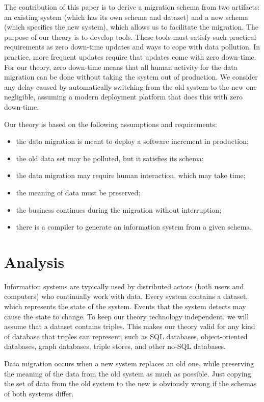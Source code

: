 \documentclass{elsarticle}
\begin{document}
   The contribution of this paper is to derive a migration schema from two artifacts: an existing system
   (which has its own schema and dataset) and a new schema (which specifies the new system),
   which allows us to facilitate the migration.
   The purpose of our theory is to develop tools.
   These tools must satisfy such practical requirements as
   zero down-time updates and ways to cope with data pollution.
   In practice, more frequent updates require that updates come with zero down-time.
   For our theory, zero down-time means that all human activity for the data migration can be done without taking the system out of production.
   We consider any delay caused by automatically switching from the old system to the new one negligible,
   assuming a modern deployment platform that does this with zero down-time.
   
   Our theory is based on the following assumptions and requirements:
\begin{itemize}
   \item the data migration is meant to deploy a software increment in production;
   \item the old data set may be polluted, but it satisfies its schema;
   \item the data migration may require human interaction, which may take time;
   \item the meaning of data must be preserved;
   \item the business continues during the migration without interruption;
   \item there is a compiler to generate an information system from a given schema.
\end{itemize}


\section{Analysis}
   Information systems are typically used by distributed actors (both users and computers) who continually work with data.
   Every system contains a dataset, which represents the state of the system.
   Events that the system detects may cause the state to change.
   To keep our theory technology independent, we will assume that a dataset contains triples.
   This makes our theory valid for any kind of database that triples can represent,
   such as SQL databases, object-oriented databases, graph databases, triple stores, and other no-SQL databases.

   Data migration occurs when a new system replaces an old one,
   while preserving the meaning of the data from the old system as much as possible.
   Just copying the set of data from the old system to the new is obviously wrong if the schemas of both systems differ.
\end{document}
